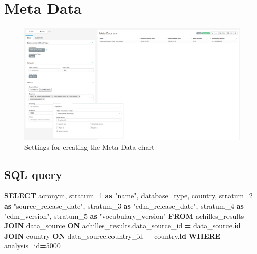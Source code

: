 \documentclass[
]{book}
\newenvironment{Shaded}{\begin{snugshade}}{\end{snugshade}}
\newcommand{\DecValTok}[1]{\textcolor[rgb]{0.00,0.00,0.81}{#1}}
\newcommand{\KeywordTok}[1]{\textcolor[rgb]{0.13,0.29,0.53}{\textbf{#1}}}
\newcommand{\NormalTok}[1]{#1}
\newcommand{\OperatorTok}[1]{\textcolor[rgb]{0.81,0.36,0.00}{\textbf{#1}}}
\newcommand{\OtherTok}[1]{\textcolor[rgb]{0.56,0.35,0.01}{#1}}
\begin{document}
\hypertarget{meta-data}{%
\section{Meta Data}\label{meta-data}}

\begin{figure}
\includegraphics[width=1\linewidth]{images/03-general/07-meta_data} \caption{Settings for creating the Meta Data chart}\label{fig:metaData}
\end{figure}

\hypertarget{sql-query-6}{%
\subsection{SQL query}\label{sql-query-6}}

\begin{Shaded}
\begin{Highlighting}[]
\KeywordTok{SELECT}
\NormalTok{  acronym,}
\NormalTok{  stratum\_1 }\KeywordTok{as} \OtherTok{"name"}\NormalTok{,}
\NormalTok{  database\_type,}
\NormalTok{  country,}
\NormalTok{  stratum\_2 }\KeywordTok{as} \OtherTok{"source\_release\_date"}\NormalTok{,}
\NormalTok{  stratum\_3 }\KeywordTok{as} \OtherTok{"cdm\_release\_date"}\NormalTok{,}
\NormalTok{  stratum\_4 }\KeywordTok{as} \OtherTok{"cdm\_version"}\NormalTok{,}
\NormalTok{  stratum\_5 }\KeywordTok{as} \OtherTok{"vocabulary\_version"}
\KeywordTok{FROM}\NormalTok{ achilles\_results}
\KeywordTok{JOIN}\NormalTok{ data\_source }\KeywordTok{ON}\NormalTok{ achilles\_results.data\_source\_id }\OperatorTok{=}\NormalTok{ data\_source.}\KeywordTok{id}
\KeywordTok{JOIN}\NormalTok{ country }\KeywordTok{ON}\NormalTok{ data\_source.country\_id }\OperatorTok{=}\NormalTok{ country.}\KeywordTok{id}
\KeywordTok{WHERE}\NormalTok{ analysis\_id}\OperatorTok{=}\DecValTok{5000}
\end{Highlighting}
\end{Shaded}
\end{document}
